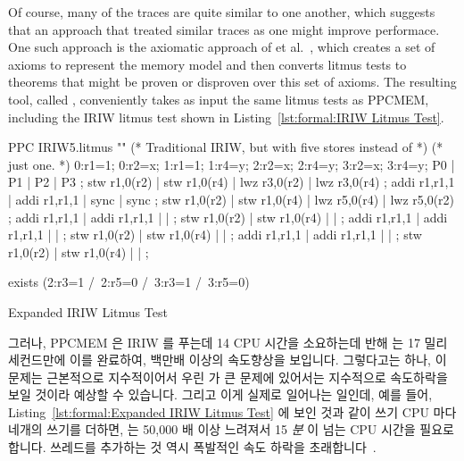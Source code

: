 Of course, many of the traces are quite similar to one another, which
suggests that an approach that treated similar traces as one might
improve performace.
One such approach is the axiomatic approach of
 et al.~\cite{Alglave:2014:HCM:2594291.2594347},
which creates a set of axioms to represent the memory model and then
converts litmus tests to theorems that might be proven or disproven
over this set of axioms.
The resulting tool, called ,  conveniently takes as input the
same litmus tests as PPCMEM, including the IRIW litmus test shown in
Listing~\ref{lst:formal:IRIW Litmus Test}.

\fi

\begin{listing}[tb]
\begin{fcvlabel}
\begin{VerbatimL}[commandchars=\%\@\$]
PPC IRIW5.litmus
""
(* Traditional IRIW, but with five stores instead of *)
(* just one.                                         *)
{
0:r1=1; 0:r2=x;
1:r1=1;         1:r4=y;
        2:r2=x; 2:r4=y;
        3:r2=x; 3:r4=y;
}
P0           | P1           | P2           | P3           ;
stw r1,0(r2) | stw r1,0(r4) | lwz r3,0(r2) | lwz r3,0(r4) ;
addi r1,r1,1 | addi r1,r1,1 | sync         | sync         ;
stw r1,0(r2) | stw r1,0(r4) | lwz r5,0(r4) | lwz r5,0(r2) ;
addi r1,r1,1 | addi r1,r1,1 |              |              ;
stw r1,0(r2) | stw r1,0(r4) |              |              ;
addi r1,r1,1 | addi r1,r1,1 |              |              ;
stw r1,0(r2) | stw r1,0(r4) |              |              ;
addi r1,r1,1 | addi r1,r1,1 |              |              ;
stw r1,0(r2) | stw r1,0(r4) |              |              ;

exists
(2:r3=1 /\ 2:r5=0 /\ 3:r3=1 /\ 3:r5=0)
\end{VerbatimL}
\end{fcvlabel}
\caption{Expanded IRIW Litmus Test}
\label{lst:formal:Expanded IRIW Litmus Test}
\end{listing}

그러나, PPCMEM 은 IRIW 를 푸는데 14 CPU 시간을 소요하는데 반해  는 17
밀리세컨드만에 이를 완료하여, 백만배 이상의 속도향상을 보입니다.
그렇다고는 하나, 이 문제는 근본적으로 지수적이어서 우린  가 큰 문제에
있어서는 지수적으로 속도하락을 보일 것이라 예상할 수 있습니다.
그리고 이게 실제로 일어나는 일인데, 예를 들어,
Listing~\ref{lst:formal:Expanded IRIW Litmus Test} 에 보인 것과 같이 쓰기 CPU
마다 네개의 쓰기를 더하면,  는 50,000 배 이상 느려져서 15 \emph{분} 이 넘는
CPU 시간을 필요로 합니다.
쓰레드를 추가하는 것 역시 폭발적인 속도 하락을
초래합니다~\cite{PaulEMcKenney2014weakaxiom}.

